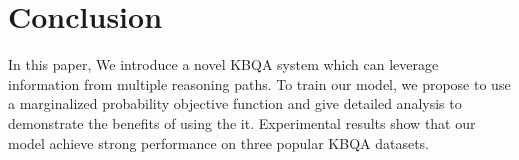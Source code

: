 \section{Conclusion}

In this paper, We introduce a novel KBQA system which can leverage information from multiple reasoning paths. To train our model, we propose to use a marginalized probability objective function and give detailed analysis to demonstrate the benefits of using the it. Experimental results show that our model achieve strong performance on three popular KBQA datasets.
